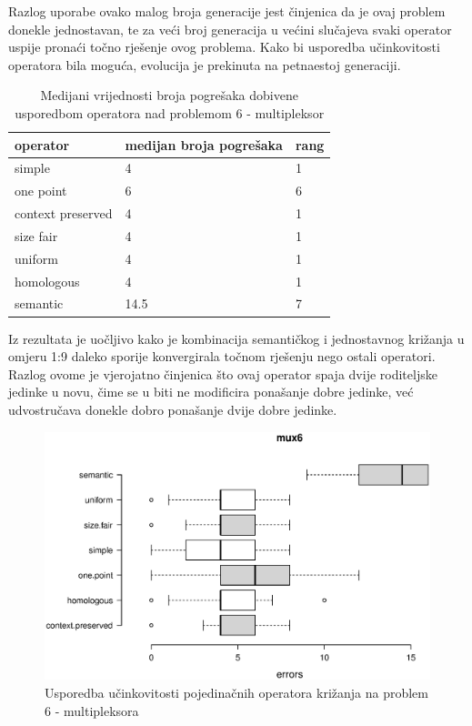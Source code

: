 Razlog uporabe ovako malog broja generacije jest činjenica da je ovaj problem donekle jednostavan, te za veći broj generacija u većini slučajeva svaki operator uspije pronaći točno rješenje ovog problema. Kako bi usporedba učinkovitosti operatora bila moguća, evolucija je prekinuta na petnaestoj generaciji.

\begin{table}[H]
 	\centering
\caption{Medijani vrijednosti broja pogrešaka dobivene usporedbom operatora nad problemom 6 - multipleksor}
    \begin{tabular}{| l | l | l |}
    \hline
    \textbf{operator}  & \textbf{medijan broja pogrešaka} & \textbf{rang}\\ \hline
    simple & 4 & 1\\ \hline
    one point & 6 & 6\\ \hline
    context preserved & 4 & 1\\ \hline
    size fair & 4 & 1\\ \hline
    uniform & 4 & 1\\ \hline
    homologous & 4 & 1\\ \hline
    semantic & 14.5 & 7\\ \hline
    \end{tabular}
    
    
    \label{mux6table}
\end{table}

Iz rezultata je uočljivo kako je kombinacija semantičkog i jednostavnog križanja u omjeru 1:9 daleko sporije konvergirala točnom rješenju nego ostali operatori. Razlog ovome je vjerojatno činjenica što ovaj operator spaja dvije roditeljske jedinke u novu, čime se u biti ne modificira ponašanje dobre jedinke, već udvostručava donekle dobro ponašanje dvije dobre jedinke.

\begin{figure}[H]
	\centering
	\includegraphics[trim=0cm 4cm 0cm 0cm, scale=0.6]{./slike/boxPlots/mux6.eps}
	\caption{Usporedba učinkovitosti pojedinačnih operatora križanja na problem 6 - multipleksora}
	\label{muxbox}
\end{figure}

